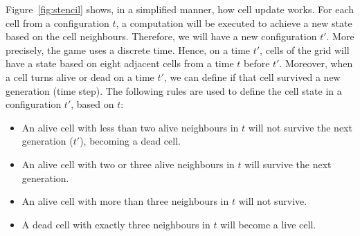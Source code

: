 \documentclass[12pt]{article}
\begin{document}
Figure~\ref{fig:stencil} shows, in a simplified manner, how cell update works. For each cell from a configuration $t$, a computation will be executed to achieve a new state based on the cell neighbours. Therefore, we will have a new configuration $t'$. More precisely, the game uses a discrete time. Hence, on a time $t'$, cells of the grid will have a state based on eight adjacent cells from a time $t$ before $t'$. Moreover, when a cell turns alive or dead on a time $t'$, we can define if that cell survived a new generation (time step). The following rules are used to define the cell state in a configuration $t'$, based on $t$:

\begin{itemize}
    \item An alive cell with less than two alive neighbours in $t$ will not survive the next generation ($t'$), becoming a dead cell.
    \item An alive cell with two or three alive neighbours in $t$ will survive the next generation.
    \item An alive cell with more than three neighbours in $t$ will not survive.
    \item A dead cell with exactly three neighbours in $t$ will become a live cell.
\end{itemize}


\end{document}

